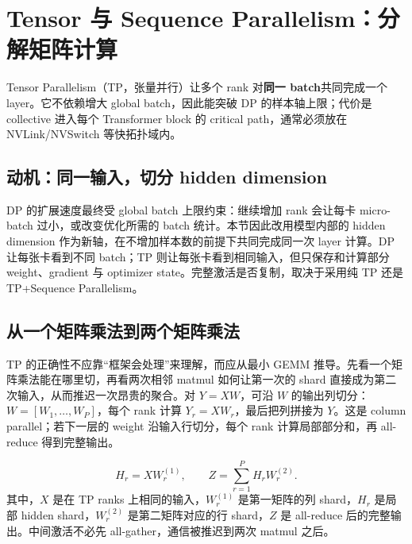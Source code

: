 \section{Tensor 与 Sequence Parallelism：分解矩阵计算}

Tensor Parallelism（TP，张量并行）让多个 rank 对\textbf{同一 batch}共同完成一个 layer。它不依赖增大 global batch，因此能突破 DP 的样本轴上限；代价是 collective 进入每个 Transformer block 的 critical path，通常必须放在 NVLink/NVSwitch 等快拓扑域内。

\subsection{动机：同一输入，切分 hidden dimension}

DP 的扩展速度最终受 global batch 上限约束：继续增加 rank 会让每卡 micro-batch 过小，或改变优化所需的 batch 统计。本节因此改用模型内部的 hidden dimension 作为新轴，在不增加样本数的前提下共同完成同一次 layer 计算。DP 让每张卡看到不同 batch；TP 则让每张卡看到相同输入，但只保存和计算部分 weight、gradient 与 optimizer state。完整激活是否复制，取决于采用纯 TP 还是 TP+Sequence Parallelism。


\subsection{从一个矩阵乘法到两个矩阵乘法}

TP 的正确性不应靠“框架会处理”来理解，而应从最小 GEMM 推导。先看一个矩阵乘法能在哪里切，再看两次相邻 matmul 如何让第一次的 shard 直接成为第二次输入，从而推迟一次昂贵的聚合。对 $Y=XW$，可沿 $W$ 的输出列切分：$W=[W_1,\ldots,W_P]$，每个 rank 计算 $Y_r=XW_r$，最后把列拼接为 $Y$。这是 column parallel；若下一层的 weight 沿输入行切分，每个 rank 计算局部部分和，再 all-reduce 得到完整输出。


\[
H_r=XW^{(1)}_r,
\qquad
Z=\sum_{r=1}^{P} H_rW^{(2)}_r.
\]
其中，$X$ 是在 TP ranks 上相同的输入，$W^{(1)}_r$ 是第一矩阵的列 shard，$H_r$ 是局部 hidden shard，$W^{(2)}_r$ 是第二矩阵对应的行 shard，$Z$ 是 all-reduce 后的完整输出。中间激活不必先 all-gather，通信被推迟到两次 matmul 之后。


